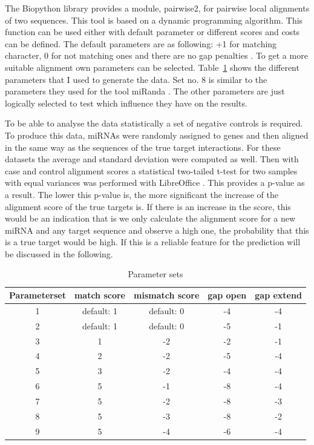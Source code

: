 \documentclass[12pt]{article}
\begin{document}
The Biopython library provides a module, pairwise2, for pairwise local alignments of two sequences. This tool is based on a dynamic programming algorithm. This function can be used either with default parameter or different scores and costs can be defined. The default parameters are as following: +1 for matching character, 0 for not matching ones and there are no gap penalties \cite{pairwise}. To get a more suitable alignment own parameters can be selected. Table~\ref{table:parameter} shows the different parameters that I used to generate the data. Set no. 8 is similar to the parameters they used for the tool miRanda \cite{Enright}. The other parameters are just logically selected to test which influence they have on the results. 

To be able to analyse the data statistically a set of negative controls is required. To produce this data, miRNAs were randomly assigned to genes and then aligned in the same way as the sequences of the true target interactions. For these datasets the average and standard deviation were computed as well. Then with case and control alignment scores a statistical two-tailed t-test for two samples with equal variances was performed with LibreOffice \cite{ttest}. This provides a p-value as a result. The lower this p-value is, the more significant the increase of the alignment score of the true targets is. If there is an increase in the score, this would be an indication that is we only calculate the alignment score for a new miRNA and any target sequence and observe a high one, the probability that this is a true target would be high. If this is a reliable feature for the prediction will be discussed in the following.

\begin{table}
\label{table:parameter}
\caption{Parameter sets}
\vspace{0.3cm}
\begin{tabular}{c|c|c|c|c}
Parameterset & match score & mismatch score & gap open & gap extend\\
\hline\hline 
1 & default: 1 & default: 0 & -4 & -4\\
2 &  default: 1 & default: 0 & -5 & -1 \\
3 &  1 & -2 & -2 & -1 \\
4 &  2 & -2 & -5 & -4 \\
5 &  3 & -2 & -4 & -4 \\
6 &  5 & -1 & -8 & -4 \\
7 &  5 & -2 & -8 & -3 \\
8 &  5 & -3 & -8 & -2 \\
9 &  5 & -4 & -6 & -4 \\
\hline
\end{tabular}
\end{table}
\end{document}
